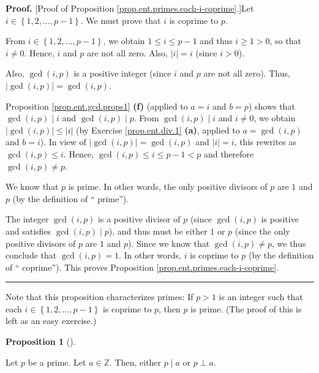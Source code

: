 \documentclass[numbers=enddot,12pt,final,onecolumn,notitlepage]{scrartcl}%
\newcounter{exer}
\numberwithin{exer}{subsection}
\theoremstyle{definition}
\newtheorem{prop}[theo]{Proposition}
\newenvironment{proposition}[1][]
{\begin{prop}[#1]\begin{leftbar}}
{\end{leftbar}\end{prop}}
\newenvironment{proof}[1][Proof]{\noindent\textbf{#1.} }{\ \rule{0.5em}{0.5em}}
\begin{document}
\begin{proof}
[Proof of Proposition \ref{prop.ent.primes.each-i-coprime}.]Let $i\in\left\{
1,2,\ldots,p-1\right\}  $. We must prove that $i$ is coprime to $p$.

From $i\in\left\{  1,2,\ldots,p-1\right\}  $, we obtain $1\leq i\leq p-1$ and
thus $i\geq1>0$, so that $i\neq0$. Hence, $i$ and $p$ are not all zero. Also,
$\left\vert i\right\vert =i$ (since $i>0$).

Also, $\gcd\left(  i,p\right)  $ is a positive integer (since $i$ and $p$ are
not all zero). Thus, $\left\vert \gcd\left(  i,p\right)  \right\vert
=\gcd\left(  i,p\right)  $.

Proposition \ref{prop.ent.gcd.props1} \textbf{(f)} (applied to $a=i$ and
$b=p$) shows that $\gcd\left(  i,p\right)  \mid i$ and $\gcd\left(
i,p\right)  \mid p$. From $\gcd\left(  i,p\right)  \mid i$ and $i\neq0$, we
obtain $\left\vert \gcd\left(  i,p\right)  \right\vert \leq\left\vert
i\right\vert $ (by Exercise \ref{prop.ent.div.1} \textbf{(a)}, applied to
$a=\gcd\left(  i,p\right)  $ and $b=i$). In view of $\left\vert \gcd\left(
i,p\right)  \right\vert =\gcd\left(  i,p\right)  $ and $\left\vert
i\right\vert =i$, this rewrites as $\gcd\left(  i,p\right)  \leq i$. Hence,
$\gcd\left(  i,p\right)  \leq i\leq p-1<p$ and therefore $\gcd\left(
i,p\right)  \neq p$.

We know that $p$ is prime. In other words, the only positive divisors of $p$
are $1$ and $p$ (by the definition of \textquotedblleft
prime\textquotedblright).

The integer $\gcd\left(  i,p\right)  $ is a positive divisor of $p$ (since
$\gcd\left(  i,p\right)  $ is positive and satisfies $\gcd\left(  i,p\right)
\mid p$), and thus must be either $1$ or $p$ (since the only positive divisors
of $p$ are $1$ and $p$). Since we know that $\gcd\left(  i,p\right)  \neq p$,
we thus conclude that $\gcd\left(  i,p\right)  =1$. In other words, $i$ is
coprime to $p$ (by the definition of \textquotedblleft
coprime\textquotedblright). This proves Proposition
\ref{prop.ent.primes.each-i-coprime}.
\end{proof}

Note that this proposition characterizes primes: If $p>1$ is an integer such
that each $i\in\left\{  1,2,\ldots,p-1\right\}  $ is coprime to $p$, then $p$
is prime. (The proof of this is left as an easy exercise.)

\begin{proposition}
\label{prop.ent.primes.div-or-coprime}Let $p$ be a prime. Let $a\in\mathbb{Z}%
$. Then, either $p\mid a$ or $p\perp a$.
\end{proposition}
\end{document}
